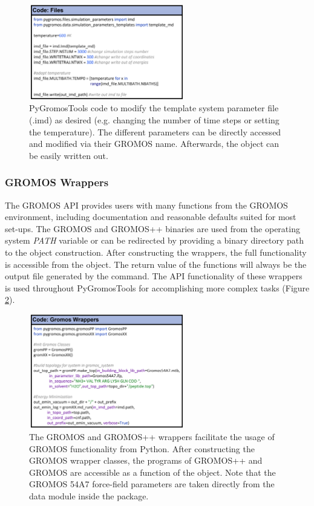 \begin{figure}[h]
    \centering
    \includegraphics[width=0.6\textwidth]{fig/ApplicationExamples/codeExample_GROMOSFiles.png}
    \caption{PyGromosTools code to modify the template system parameter file (.imd) as desired (e.g. changing the number of time steps or setting the temperature). The different parameters can be directly accessed and modified via their GROMOS name. Afterwards, the object can be easily written out.}
    \label{fig: FileHandlingExampleIMD}
\end{figure}


\subsubsection{GROMOS Wrappers}
The GROMOS API provides users with many functions from the GROMOS environment, including documentation and reasonable defaults suited for most set-ups. The GROMOS and GROMOS++ binaries are used from the operating system \textit{PATH} variable or can be redirected by providing a binary directory path to the object construction. After constructing the wrappers, the full functionality is accessible from the object. The return value of the functions will always be the output file generated by the command. The API functionality of these wrappers is used throughout PyGromosTools for accomplishing more complex tasks (Figure \ref{fig: GROMOSWrappers}).

\begin{figure}[h]
    \centering
    \includegraphics[width=0.6\textwidth]{fig/ApplicationExamples/codeExample_GROMOSWrapper.png}
    \caption{The GROMOS and GROMOS++ wrappers facilitate the usage of GROMOS functionality from Python. After constructing the GROMOS wrapper classes, the programs of GROMOS++ and GROMOS are accessible as a function of the object. Note that the GROMOS 54A7 force-field parameters are taken directly from the data module inside the package.}
    \label{fig: GROMOSWrappers}
\end{figure}

